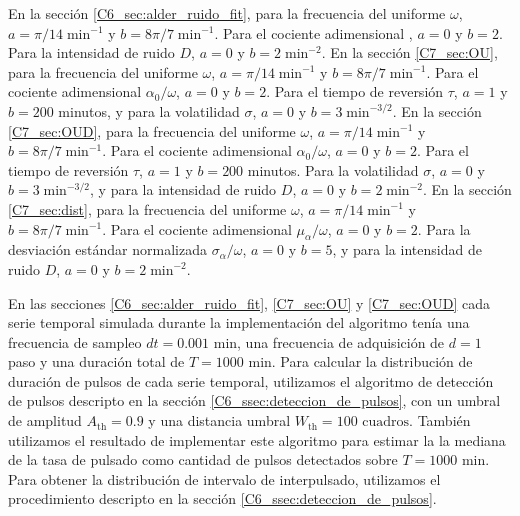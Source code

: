 \documentclass[./main.tex]{subfiles}
\begin{document}
\begin{subappendices}
En la sección \ref{C6_sec:alder_ruido_fit}, para la frecuencia del uniforme $\omega$, $a = \pi/14 \; \text{min}^{-1}$ y $b =  8\pi/7 \; \text{min}^{-1}$. Para el cociente adimensional \dddelta, $a = 0$ y $b = 2$. Para la intensidad de ruido $D$, $a = 0$ y $b = 2 \; \text{min}^{-2}$. En la sección \ref{C7_sec:OU}, para la frecuencia del uniforme $\omega$, $a = \pi/14 \; \text{min}^{-1}$ y $b =  8\pi/7 \; \text{min}^{-1}$. Para el cociente adimensional $\alpha_0/\omega$, $a = 0$ y $b = 2$. Para el tiempo de reversión $\tau$, $a = 1$ y $b = 200$ minutos, y para la volatilidad $\sigma$, $a = 0$ y $b = 3 \; \text{min}^{-3/2}$. En la sección \ref{C7_sec:OUD}, para la frecuencia del uniforme $\omega$, $a = \pi/14 \; \text{min}^{-1}$ y $b =  8\pi/7 \; \text{min}^{-1}$. Para el cociente adimensional $\alpha_0/\omega$, $a = 0$ y $b = 2$. Para el tiempo de reversión $\tau$, $a = 1$ y $b = 200$ minutos. Para la volatilidad $\sigma$, $a = 0$ y $b = 3 \; \text{min}^{-3/2}$, y para la intensidad de ruido $D$, $a = 0$ y $b = 2\; \text{min}^{-2}$. En la sección \ref{C7_sec:dist}, para la frecuencia del uniforme $\omega$, $a = \pi/14 \; \text{min}^{-1}$ y $b =  8\pi/7 \; \text{min}^{-1}$. Para el cociente adimensional $\mu_{\alpha}/\omega$, $a = 0$ y $b = 2$. Para la desviación estándar normalizada $\sigma_{\alpha}/\omega$, $a = 0$ y $b = 5$, y para la intensidad de ruido $D$, $a = 0$ y $b = 2\; \text{min}^{-2}$.


En las secciones \ref{C6_sec:alder_ruido_fit}, \ref{C7_sec:OU} y \ref{C7_sec:OUD} cada serie temporal simulada durante la implementación del algoritmo tenía una frecuencia de sampleo $dt = 0.001 \text{ min}$, una frecuencia de adquisición de $d = 1$ paso y una duración total de $T = 1000 \text{ min}$. Para calcular la distribución de duración de pulsos de cada serie temporal, utilizamos el algoritmo de detección de pulsos descripto en la sección \ref{C6_ssec:deteccion_de_pulsos}, con un umbral de amplitud $A_{\text{th}} = 0.9$ y una distancia umbral $W_{\text{th}} = 100 \text{ cuadros}$. También utilizamos el resultado de implementar este algoritmo para estimar la la mediana de la tasa de pulsado como cantidad de pulsos detectados sobre $T = 1000 \text{ min}$. Para obtener la distribución de intervalo de interpulsado, utilizamos el procedimiento descripto en la sección \ref{C6_ssec:deteccion_de_pulsos}.  



\end{subappendices}
\end{document}
